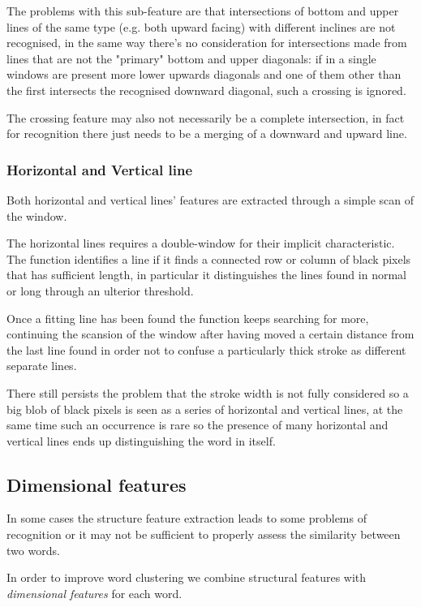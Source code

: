 The problems with this sub-feature are that intersections of bottom and upper lines of the same type (e.g. both upward facing) with different inclines are not recognised, in the same way there's no consideration for intersections made from lines that are not the "primary" bottom and upper diagonals: if in a single windows are present more lower upwards diagonals and one of them other than the first intersects the recognised downward diagonal, such a crossing is ignored.

The crossing feature may also not necessarily be a complete intersection, in fact for recognition there just needs to be a merging of a downward and upward line. 


\subsubsection{Horizontal and Vertical line}
Both horizontal and vertical lines' features are extracted through
a simple scan of the window.

The horizontal lines requires a double-window for their implicit characteristic.
The function identifies a line if it finds a connected row or column of black pixels that has sufficient length, in particular it distinguishes the lines found in normal or long through an ulterior threshold.

Once a fitting line has been found the function keeps searching for more, continuing the scansion of the window after having moved a certain distance from the last line found in order not to confuse a particularly thick stroke as different separate lines.

There still persists the problem that the stroke width is not fully considered so a big blob of black pixels is seen as a series of horizontal and vertical lines, at the same time such an occurrence is rare so the presence of many horizontal and vertical lines ends up distinguishing the word in itself.    

\subsection{Dimensional features}

In some cases the structure feature extraction leads to some problems of recognition or it may not be sufficient to properly assess the similarity between two words.

In order to improve word clustering we combine structural features with \emph{dimensional features} for each word. 

